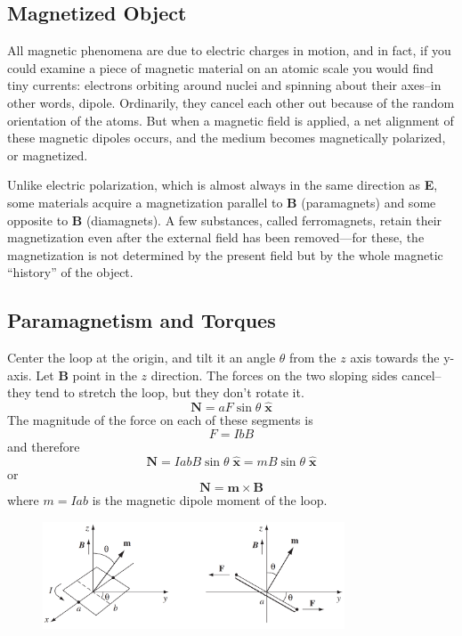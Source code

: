 \documentclass[../../../main.tex]{subfiles}
\begin{document}
\subsection*{Magnetized Object}
All magnetic phenomena are due to electric charges in motion, and in fact, if you could examine a piece of magnetic material on an atomic scale you would ﬁnd tiny currents: electrons orbiting around nuclei and spinning about their axes--in other words, dipole. Ordinarily, they cancel each other out because of the random orientation of the atoms. But when a magnetic ﬁeld is applied, a net alignment of these magnetic dipoles occurs, and the medium becomes magnetically polarized, or magnetized. 

Unlike electric polarization, which is almost always in the same direction as \textbf{E}, some materials acquire a magnetization parallel to \textbf{B} (paramagnets) and some opposite to \textbf{B} (diamagnets). A few substances, called ferromagnets, retain their magnetization even after the external ﬁeld has been removed—for these, the magnetization is not determined by the present ﬁeld but by the whole magnetic “history” of the object.

\subsection*{Paramagnetism and Torques}
Center the loop at the origin, and tilt it an angle $\theta$ from the $z$ axis towards the y-axis. Let \textbf{B} point in the $z$ direction. The forces on the two sloping sides cancel--they tend to stretch the loop, but they don’t rotate it. 
\begin{equation*}
    \mathbf{N} = aF \sin \theta\; \mathbf{\hat{x}}
\end{equation*}
The magnitude of the force on each of these segments is
\begin{equation*}
    F = I bB
\end{equation*}
and therefore
\begin{equation*}
    \mathbf{N} = I abB \sin \theta\; \mathbf{\hat{x}}=mB\sin\theta\;\mathbf{\hat{x}}
\end{equation*}
or
\begin{equation*}
    \mathbf{N}=\mathbf{m}\times\mathbf{B}
\end{equation*}
where $m = I ab$ is the magnetic dipole moment of the loop. 
\begin{figure}[b]
    \centering
    \includegraphics[width=0.8\textwidth]{../Rss/Electromagnetism/FieldInsideMatter/Torque.png}
\end{figure}
\end{document}
